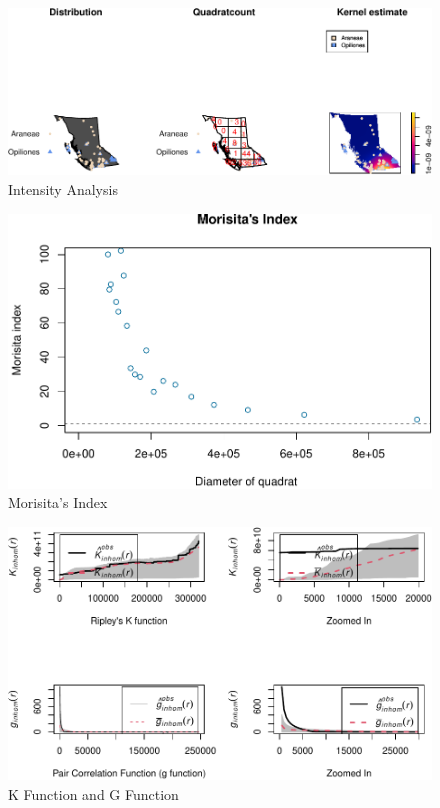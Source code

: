 \documentclass{article}
\begin{document}
\begin{figure}
\centering
\includegraphics{Arachnida_files/figure-latex/Arachnida.Intensity.PLot-1.pdf}
\caption{\label{fig:intensity}Intensity Analysis}
\end{figure}

\begin{figure}
\centering
\includegraphics{Arachnida_files/figure-latex/Morisita-1.pdf}
\caption{\label{fig:Morisita}Morisita's Index}
\end{figure}

\begin{figure}
\centering
\includegraphics{Arachnida_files/figure-latex/KG.plot-1.pdf}
\caption{\label{fig:FandG}K Function and G Function}
\end{figure}
\end{document}
